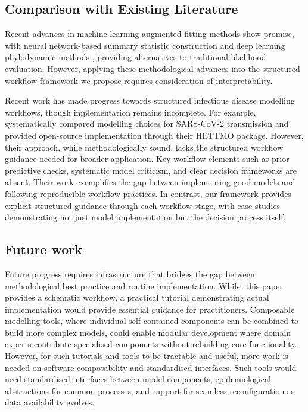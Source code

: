 \documentclass{article}
\begin{document}
\subsection{Comparison with Existing Literature}

Recent advances in machine learning-augmented fitting methods show promise, with neural network-based summary statistic construction \citep{raynal2019abc} and deep learning phylodynamic methods \citep{voznica2022deep}, providing alternatives to traditional likelihood evaluation. However, applying these methodological advances into the structured workflow framework we propose requires consideration of interpretability.

Recent work has made progress towards structured infectious disease modelling workflows, though implementation remains incomplete.
For example, \citet{bouman2024bayesian} systematically compared modelling choices for SARS-CoV-2 transmission and provided open-source implementation through their HETTMO package.
However, their approach, while methodologically sound, lacks the structured workflow guidance needed for broader application.
Key workflow elements such as prior predictive checks, systematic model criticism, and clear decision frameworks are absent.
Their work exemplifies the gap between implementing good models and following reproducible workflow practices.
In contrast, our framework provides explicit structured guidance through each workflow stage, with case studies demonstrating not just model implementation but the decision process itself.

\subsection{Future work}

Future progress requires infrastructure that bridges the gap between methodological best practice and routine implementation.
Whilst this paper provides a schematic workflow, a practical tutorial demonstrating actual implementation would provide essential guidance for practitioners.
Composable modelling tools, where individual self contained components can be combined to build more complex models, could enable modular development where domain experts contribute specialised components without rebuilding core functionality.
However, for such tutorials and tools to be tractable and useful, more work is needed on software composability and standardised interfaces.
Such tools would need standardised interfaces between model components, epidemiological abstractions for common processes, and support for seamless reconfiguration as data availability evolves.
\end{document}
